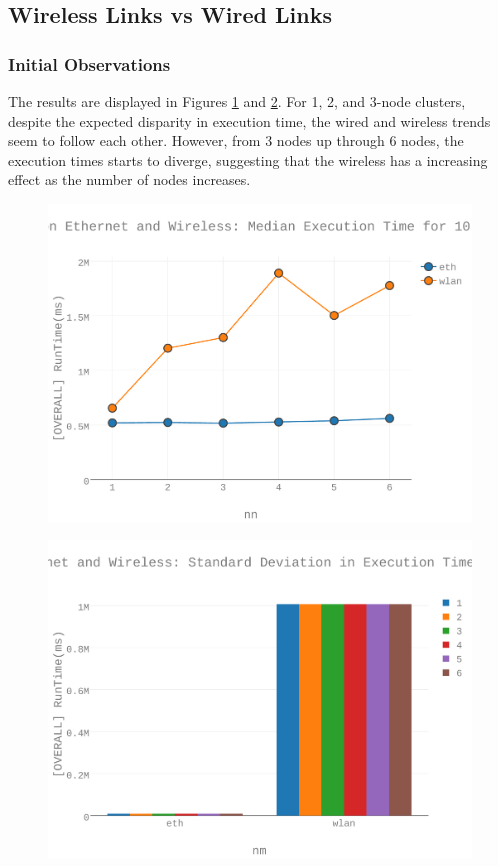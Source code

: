 \subsection{Wireless Links vs Wired Links}
\subsubsection{Initial Observations}
The results are displayed in Figures \ref{figures-wle_fig7} and \ref{figures-wle_fig9}.  For 1, 2, and 3-node clusters, despite the expected  disparity in execution time, the wired and wireless trends seem to follow each other.  However, from 3 nodes up through 6 nodes, the execution times starts to diverge, suggesting that the wireless has a increasing effect as the number of nodes increases. \begin{figure}[h]
\includegraphics[width=5.5in]{Figures/figures-wle_fig7.pdf}
\caption{}
\label{figures-wle_fig7}
\end{figure}

\begin{figure}[h]
\includegraphics[width=5.5in]{Figures/figures-wle_fig9.pdf}
\caption{}
\label{figures-wle_fig9}
\end{figure}




